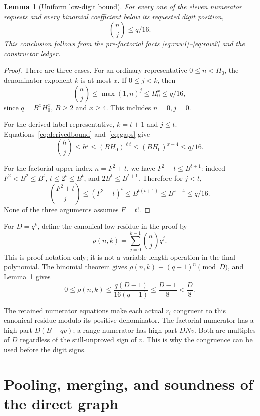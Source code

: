 \documentclass[11pt]{article}
\newtheorem{lemma}[theorem]{Lemma}
\begin{document}
\begin{lemma}[Uniform low-digit bound]\label{lem:digits}
For every one of the eleven numerator requests and every binomial
coefficient below its requested digit position,
\begin{equation}
 \binom nj\le q/16.
 \label{eq:smallcoeff}
\end{equation}
This conclusion follows from the pre-factorial facts
\eqref{eq:raw1}--\eqref{eq:raw2} and the constructor ledger.
\end{lemma}
\begin{proof}
There are three cases. For an ordinary representative $0\le n<H_0$,
the denominator exponent $k$ is at most $x$. If $0\le j<k$, then
\[
 \binom nj\le\max(1,n)^j\le H_0^x\le q/16,
\]
since $q=B^xH_0^x$, $B\ge2$ and $x\ge4$. This includes $n=0,j=0$.

For the derived-label representative, $k=t+1$ and $j\le t$.
Equations~\eqref{eq:derivedbound} and~\eqref{eq:gaps} give
\[
 \binom hj\le h^j\le(BH_0)^{\ell t}
       \le(BH_0)^{x-4}\le q/16.
\]

For the factorial upper index $n=F^2+t$, we have
$F^2+t\le B^{t+1}$: indeed $F^2<B^2\le B^t$,
$t\le2^t\le B^t$, and $2B^t\le B^{t+1}$. Therefore for $j<t$,
\[
 \binom{F^2+t}{j}\le(F^2+t)^t
      \le B^{t(t+1)}\le B^{x-4}\le q/16.
\]
None of the three arguments assumes $F=t!$.
\end{proof}

For $D=q^k$, define the canonical low residue in the proof by
\[
 \rho(n,k)=\sum_{j=0}^{k-1}\binom nj q^j.
\]
This is proof notation only; it is not a variable-length operation in the
final polynomial. The binomial theorem gives
$\rho(n,k)\equiv(q+1)^n\pmod D$, and Lemma~\ref{lem:digits} gives
\begin{equation}
 0\le\rho(n,k)\le\frac{q(D-1)}{16(q-1)}
       \le\frac{D-1}{8}<\frac D8.
 \label{eq:smallrho}
\end{equation}

The retained numerator equations make each actual $r_i$ congruent to
this canonical residue modulo its positive denominator. The factorial
numerator has a high part $D(B+qv)$; a range numerator has high part
$DNv$. Both are multiples of $D$ regardless of the still-unproved sign
of $v$. This is why the congruence can be used before the digit signs.

\section{Pooling, merging, and soundness of the direct graph}
\end{document}
